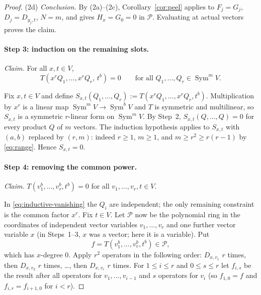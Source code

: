 \documentclass[11pt]{article}
\theoremstyle{remark}
\DeclareMathOperator{\Sym}{Sym}
\newcommand{\D}[2]{D_{#1,#2}}
\newcommand{\PP}{\mathcal P}
\begin{document}
\begin{proof}
(2d) \emph{Conclusion.} By (2a)--(2c), Corollary~\ref{cor:peel} applies to
$F_j=G_j$, $D_j=\D{y_j}{t}$, $N=m$, and gives $H_x=G_0=0$ in $\PP$.
Evaluating at actual vectors proves the claim.

\paragraph{Step 3: induction on the remaining slots.}
\emph{Claim.} For all $x,t\in V$,
\begin{equation}\label{eq:inductive-vanishing}
 T(x^rQ_1,\ldots,x^rQ_r,\,t^b)=0
 \qquad\text{for all }Q_1,\ldots,Q_r\in\Sym^m V.
\end{equation}

Fix $x,t\in V$ and define
$S_{x,t}(Q_1,\ldots,Q_r):=T(x^rQ_1,\ldots,x^rQ_r,t^b)$. Multiplication by
$x^r$ is a linear map $\Sym^mV\to\Sym^bV$ and $T$ is symmetric and
multilinear, so $S_{x,t}$ is a symmetric $r$-linear form on $\Sym^mV$. By
Step~2, $S_{x,t}(Q,\dots,Q)=0$ for every product $Q$ of $m$ vectors. The
induction hypothesis applies to $S_{x,t}$ with $(a,b)$ replaced by $(r,m)$:
indeed $r\ge1$, $m\ge1$, and $m\ge r^2\ge r(r-1)$ by \eqref{eq:range}.
Hence $S_{x,t}=0$.

\paragraph{Step 4: removing the common power.}
\emph{Claim.} $T(v_1^b,\ldots,v_r^b,t^b)=0$ for all
$v_1,\dots,v_r,t\in V$.

In \eqref{eq:inductive-vanishing} the $Q_i$ are independent; the only
remaining constraint is the common factor $x^r$. Fix $t\in V$. Let $\PP$
now be the polynomial ring in the coordinates of independent vector
variables $v_1,\ldots,v_r$ and one further vector variable $x$ (in
Steps~1--3, $x$ was a vector; here it is a variable). Put
\[
 f=T(v_1^b,\ldots,v_r^b,t^b)\in\PP ,
\]
which has $x$-degree $0$. Apply $r^2$ operators in the following order:
$\D{x}{v_1}$ $r$ times, then $\D{x}{v_2}$ $r$ times, \dots, then
$\D{x}{v_r}$ $r$ times. For $1\le i\le r$ and $0\le s\le r$ let $f_{i,s}$
be the result after all operators for $v_1,\dots,v_{i-1}$ and $s$ operators
for $v_i$ (so $f_{1,0}=f$ and $f_{i,r}=f_{i+1,0}$ for $i<r$).


\end{proof}
\end{document}
